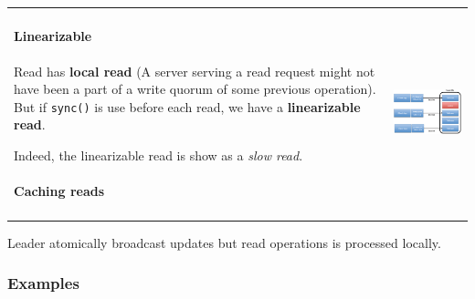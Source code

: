\begin{tabular}{m{9cm}m{6cm}}
\begin{itemize}
            \paragraph{Linearizable}
            Read has \textbf{local read} (A  server  serving  a  read  request  might  not  have  been  a  part  of  a  write  
            quorum  of  some  previous  operation). 
            But if \texttt{sync()} is use before each read, we have a \textbf{linearizable read}.

            Indeed, the linearizable read is show as a \textit{slow read}.

            \paragraph{Caching reads}
    \end{itemize}
    &
    \includegraphics[width=7cm]{img/zook}
\end{tabular}

Leader atomically broadcast updates but read operations is processed
locally.


\subsubsection{Examples}


